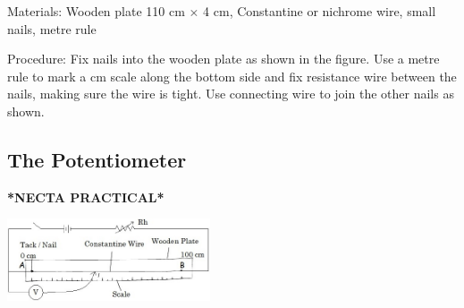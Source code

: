 \begin{multicols}{2}
\begin{description*}
\item[Materials:]{Wooden plate 110 cm $\times$ 4 cm, Constantine or nichrome wire, small nails, metre rule}
\item[Procedure:]{Fix nails into the wooden plate as shown in the figure. Use a metre rule to mark a cm scale along the bottom side and fix resistance wire between the nails, making sure the wire is tight. Use connecting wire to join the other nails as shown.}
\end{description*}

\subsection{The Potentiometer}
\textbf{*NECTA PRACTICAL*}

\begin{center}
\includegraphics[width=0.45\textwidth]{./img/potentiometer.jpg}
\end{center}


\end{multicols}
